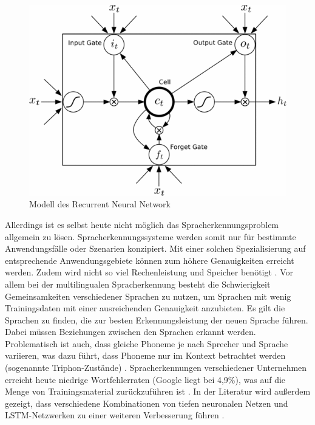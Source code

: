 \begin{figure}[h!]
	\centering
	\includegraphics[width=1\linewidth]{images/lstm_cell}
	\caption{Modell des Recurrent Neural Network \cite{deeplearning4j}} %
	\label{fig:topology}
\end{figure}  

Allerdings ist es selbst heute nicht möglich das Spracherkennungsproblem allgemein zu lösen. Spracherkennungssysteme werden somit nur für bestimmte Anwendungsfälle oder Szenarien konzipiert. Mit einer solchen Spezialisierung auf entsprechende Anwendungsgebiete können zum höhere Genauigkeiten erreicht werden. Zudem wird nicht so viel Rechenleistung und Speicher benötigt {\cite{beat_tobias}}. Vor allem bei der multilingualen Spracherkennung besteht die Schwierigkeit Gemeinsamkeiten verschiedener Sprachen zu nutzen, um Sprachen mit wenig Trainingsdaten mit einer ausreichenden Genauigkeit anzubieten. Es gilt die Sprachen zu finden, die zur besten Erkennungsleistung der neuen Sprache führen. Dabei müssen Beziehungen zwischen den Sprachen erkannt werden. Problematisch ist auch, dass gleiche Phoneme je nach Sprecher und Sprache variieren, was dazu führt, dass Phoneme nur im Kontext betrachtet werden (sogenannte Triphon-Zustände) {\cite{Yu.2014}}. Spracherkennungen verschiedener Unternehmen erreicht heute niedrige Wortfehlerraten (Google liegt bei 4,9\%), was auf die Menge von Trainingsmaterial zurückzuführen ist {\cite{venturebeat}} {\cite{9to5google}} {\cite{businessinsider}}. In der Literatur wird außerdem gezeigt, dass verschiedene Kombinationen von tiefen neuronalen Netzen und LSTM-Netzwerken zu einer weiteren Verbesserung führen {\cite{6638947}}. 